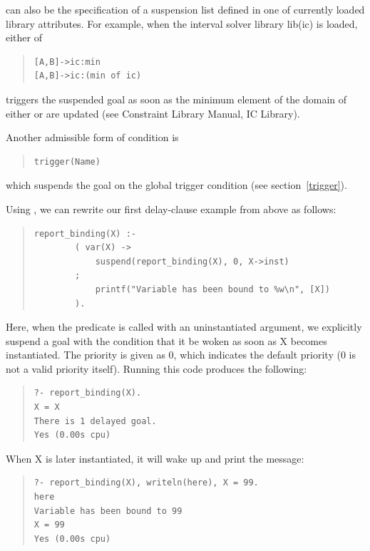  can also be the specification of a suspension list
defined in one of currently loaded library attributes. For example, when the
interval solver library lib(ic) is loaded, either of
\begin{quote}
\begin{verbatim}
[A,B]->ic:min
[A,B]->ic:(min of ic)
\end{verbatim}
\end{quote}
triggers the suspended goal as soon as the minimum element
of the domain of either  or  are updated
(see Constraint Library Manual, IC Library).

Another admissible form of condition  is
\begin{quote}
\begin{verbatim}
trigger(Name)
\end{verbatim}
\end{quote}
which suspends the goal on the global trigger condition 
(see section~\ref{trigger}).


Using
,
we can rewrite our first delay-clause example from above as follows:
\begin{quote}
\begin{verbatim}
report_binding(X) :-
        ( var(X) ->
            suspend(report_binding(X), 0, X->inst)
        ;
            printf("Variable has been bound to %w\n", [X])
        ).
\end{verbatim}
\end{quote}
Here, when the predicate is called with an uninstantiated argument,
we explicitly suspend a goal with the condition that it be woken as
soon as X becomes instantiated. The priority is given as 0, which indicates
the default priority (0 is not a valid priority itself).
Running this code produces the following:
\begin{quote}
\begin{verbatim}
?- report_binding(X).
X = X
There is 1 delayed goal.
Yes (0.00s cpu)
\end{verbatim}
\end{quote}
When X is later instantiated, it will wake up and print the message:
\begin{quote}
\begin{verbatim}
?- report_binding(X), writeln(here), X = 99.
here
Variable has been bound to 99
X = 99
Yes (0.00s cpu)
\end{verbatim}
\end{quote}



